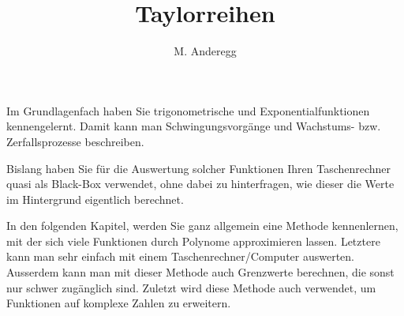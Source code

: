 \documentclass[a4paper, 11pt]{article}
\begin{document}
\title{Taylorreihen}
\author{M. Anderegg}
\date{} %
\maketitle
Im Grundlagenfach haben Sie trigonometrische und Exponentialfunktionen kennengelernt. Damit kann man Schwingungsvorgänge und Wachstums- bzw. Zerfallsprozesse beschreiben.

Bislang haben Sie für die Auswertung solcher Funktionen Ihren Taschenrechner quasi als Black-Box verwendet, ohne dabei zu hinterfragen, wie dieser die Werte im Hintergrund eigentlich berechnet.

In den folgenden Kapitel, werden Sie ganz allgemein eine Methode kennenlernen, mit der sich viele Funktionen durch Polynome approximieren lassen. Letztere kann man sehr einfach mit einem Taschenrechner/Computer auswerten. Ausserdem kann man mit dieser Methode auch Grenzwerte berechnen, die sonst nur schwer zugänglich sind. Zuletzt wird diese Methode auch verwendet, um Funktionen auf komplexe Zahlen zu erweitern.



\newpage




\clearpage

\clearpage

%

\clearpage
%

\clearpage
%

\clearpage

\clearpage

\end{document}
